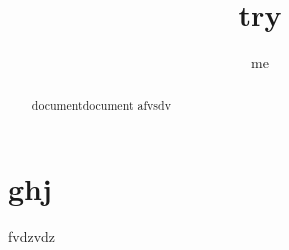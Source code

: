 \documentclass[]{article}
\title{try}
\author{me}
\begin{document}
\maketitle

\begin{abstract}documentdocument
afvsdv
\end{abstract}

\section{ghj}
fvdzvdz
\end{document}
